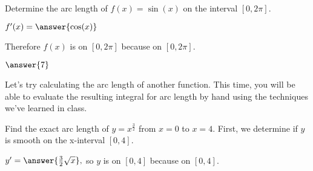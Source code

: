 \documentclass{ximera}
\begin{document}
\begin{problem}

Determine the arc length of $f(x) = \sin(x)$ on the interval $[0, 2\pi].$

$f'(x) = \answer{\cos(x)}$

\begin{problem}

Therefore $f(x)$ is  on $[0,2\pi]$ because  on $[0,2\pi]$.  

\begin{problem}

$\answer{7}$

\end{problem}
\end{problem}
\end{problem}

Let's try calculating the arc length of another function.  This time, you will be able to evaluate the resulting integral for arc length by hand using the techniques we've learned in class.

\begin{problem}

Find the exact arc length of $y = x^{\frac{3}{2}}$ from $x=0$ to $x=4$.  First, we determine if $y$ is smooth on the x-interval $[0,4]$.  

$y' = \answer{\frac{3}{2}\sqrt{x}},$ so $y$ is  on $[0,4]$ because  on $[0,4]$.  

\end{problem}
\end{document}
